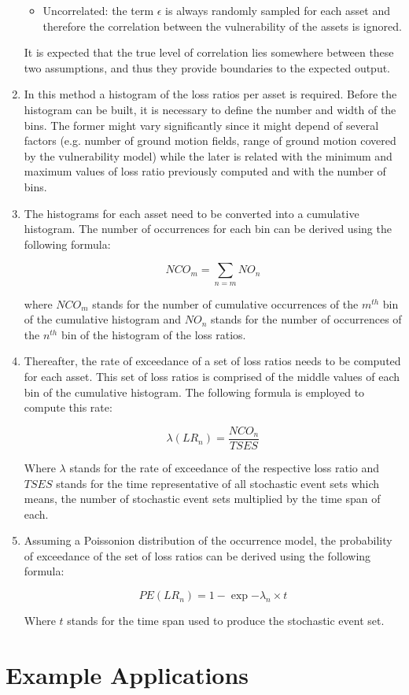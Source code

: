 \begin{enumerate}
\begin{itemize}
\item Uncorrelated: the term $\epsilon$ is always randomly sampled for each asset and therefore the correlation between the vulnerability of the assets is ignored.

\end{itemize}

It is expected that the true level of correlation lies somewhere between these two assumptions, and thus they provide boundaries to the expected output. 

\item In this method a histogram of the loss ratios per asset is required. Before the histogram can be built, it is necessary to define the number and width of the bins. The former might vary significantly since it might depend of several factors (e.g. number of ground motion fields, range of ground motion covered by the vulnerability model) while the later is related with the minimum and maximum values of loss ratio previously computed and with the number of bins. 

\item The histograms for each asset need to be converted into a cumulative histogram. The number of occurrences for each bin can be derived using the following formula:

\begin{equation}
NCO_m = \sum_{n=m} NO_n
\end{equation}

where $NCO_m$ stands for the number of cumulative occurrences of the $m^{th}$ bin of the cumulative histogram and $NO_n$ stands for the number of occurrences of the $n^{th}$ bin of the histogram of the loss ratios.

\item Thereafter, the rate of exceedance of a set of loss ratios needs to be computed for each asset. This set of loss ratios is comprised of the middle values of each bin of the cumulative histogram. The following formula is employed to compute this rate:

\begin{equation}
\lambda(LR_n) = \frac{NCO_n}{TSES}
\end{equation}

Where $\lambda$ stands for the rate of exceedance of the respective loss ratio and $TSES$ stands for the time representative of all stochastic event sets which means, the number of stochastic event sets multiplied by the time span of each.

\item Assuming a Poissonion distribution of the occurrence model, the probability of exceedance of the set of loss ratios can be derived using the following formula:

\begin{equation}
PE(LR_n) = 1-\exp{-\lambda_n\times t}
\end{equation}

Where $t$ stands for the time span used to produce the stochastic event set.

\end{enumerate}

\section{Example Applications}

